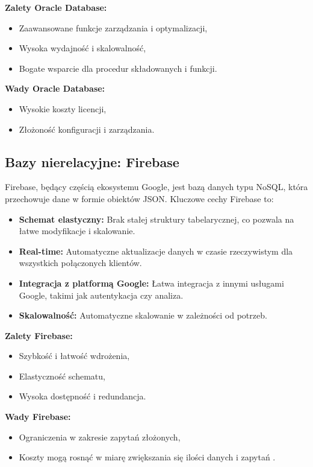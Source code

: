 \textbf{Zalety Oracle Database:}
\begin{itemize}
\item Zaawansowane funkcje zarządzania i optymalizacji,
\item Wysoka wydajność i skalowalność,
\item Bogate wsparcie dla procedur składowanych i funkcji.
\end{itemize}

\textbf{Wady Oracle Database:}
\begin{itemize}
\item Wysokie koszty licencji,
\item Złożoność konfiguracji i zarządzania.
\end{itemize}

\subsection{Bazy nierelacyjne: Firebase}

Firebase, będący częścią ekosystemu Google, jest bazą danych typu NoSQL, która przechowuje dane w formie obiektów JSON. Kluczowe cechy Firebase to:

\begin{itemize}
\item \textbf{Schemat elastyczny:} Brak stałej struktury tabelarycznej, co pozwala na łatwe modyfikacje i skalowanie.
\item \textbf{Real-time:} Automatyczne aktualizacje danych w czasie rzeczywistym dla wszystkich połączonych klientów.
\item \textbf{Integracja z platformą Google:} Łatwa integracja z innymi usługami Google, takimi jak autentykacja czy analiza.
\item \textbf{Skalowalność:} Automatyczne skalowanie w zależności od potrzeb.
\end{itemize}

\textbf{Zalety Firebase:}
\begin{itemize}
\item Szybkość i łatwość wdrożenia,
\item Elastyczność schematu,
\item Wysoka dostępność i redundancja.
\end{itemize}

\textbf{Wady Firebase:}
\begin{itemize}
\item Ograniczenia w zakresie zapytań złożonych,
\item Koszty mogą rosnąć w miarę zwiększania się ilości danych i zapytań \cite{firebaseDb}.
\end{itemize}
